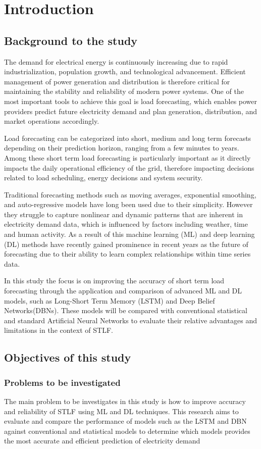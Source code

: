 \chapter{Introduction}

\section{Background to the study}
The demand for electrical energy is continuously increasing due to rapid industrialization, population growth, and technological advancement. Efficient management of power generation and distribution is therefore critical for maintaining the stability and reliability of modern power systems. One of the most important tools to achieve this goal is load forecasting, which enables power providers predict future electricity demand and plan generation, distribution, and market operations accordingly.

Load forecasting can be categorized into short, medium and long term forecasts depending on their prediction horizon, ranging from a few minutes to years. Among these short term load forecasting is particularly important as it directly impacts the daily operational efficiency of the grid, therefore impacting decisions related to load scheduling, energy decisions and system security.

Traditional forecasting methods such as moving averages, exponential smoothing, and auto-regressive models have long been used due to their simplicity. However they struggle to capture nonlinear and dynamic patterns that are inherent in electricity demand data, which is influenced by factors including weather, time and human activity. As a result of this machine learning (ML) and deep learning (DL) methods have recently gained prominence in recent years as the future of forecasting due to their ability to learn complex relationships within time series data.

In this study the focus is on improving the accuracy of short term load forecasting through the application and comparison of advanced ML and DL models, such as Long-Short Term Memory (LSTM) and Deep Belief Networks(DBNs). These models will be compared with conventional statistical and standard Artificial Neural Networks to evaluate their relative advantages and limitations in the context of STLF.
\section{Objectives of this study}
\subsection{Problems to be investigated}
The main problem to be investigates in this study is how to improve accuracy and reliability of STLF using ML and DL techniques. This research aims to evaluate and compare the performance of models such as the LSTM and DBN against conventional and statistical models to determine which models provides the most accurate and efficient prediction of electricity demand 
